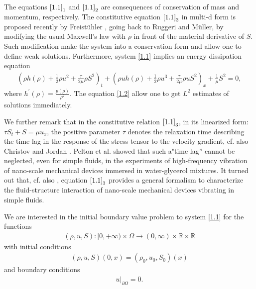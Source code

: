 \documentclass[10pt,reqno]{amsart}
\numberwithin{equation}{section}
\begin{document}
The equations $\eqref{1.1}_1$ and $\eqref{1.1}_2$ are consequences of conservation of mass and momentum, respectively. The constitutive equation $\eqref{1.1}_3$ in multi-d form  is proposed recently by Freist\"uhler \cite{Frei1}, going back to Ruggeri \cite{Rug83} and M\"uller\cite{Mu67}, by modifying the usual Maxwell's law \cite{Max1867} with $\rho$ in front of the material derivative of $S$. Such modification make the system into a conservation form and allow one to define weak solutions. Furthermore, system \eqref{1.1} implies an energy dissipation equation
\begin{align}\label{1.2}
\left( \rho h(\rho)+\frac{1}{2} \rho u^2+\frac{\tau}{2\mu} \rho S^2 \right)_t+\left( \rho u h(\rho)+\frac{1}{2} \rho u^3 +\frac{\tau}{2\mu}\rho u S^2\right)_x+\frac{1}{\mu} S^2=0,
\end{align}
where $h^\prime(\rho)=\frac{p(\rho)}{\rho^2}$. The equation \eqref{1.2} allow one to get $L^2$ estimates of solutions immediately. 

We further remark that  in the constitutive relation $\eqref{1.1}_3$, in its linearized form: $\tau S_t+S=\mu u_x$, the positive parameter $\tau$ denotes the relaxation time describing the time lag in the response of the stress tensor to the velocity gradient, cf. also Christov and Jordan \cite{CJo}.   Pelton et al. \cite{Peetal} showed that such a"time lag'' cannot be neglected, even for simple fluids, in
the experiments of high-frequency vibration of nano-scale mechanical devices immersed in water-glycerol mixtures. It turned out
  that, cf. also \cite{ChSa015}, equation $\eqref{1.1}_3$ provides a general formalism  to characterize the fluid-structure interaction
of nano-scale mechanical devices vibrating in simple fluids.

We are interested in the initial boundary value problem to system \eqref{1.1}   for the functions
\begin{align*}
(\rho, u, S): [0, +\infty) \times \Omega \rightarrow (0, \infty)\times \mathbb R \times \mathbb R
\end{align*}
with initial conditions
\begin{align} \label{1.3}
(\rho, u, S)(0,x)=(\rho_0, u_0, S_0)(x)
\end{align}
 and boundary conditions
 \begin{align}\label{1.4}
u\big|_{\partial\Omega}=0.
\end{align}
\end{document}
